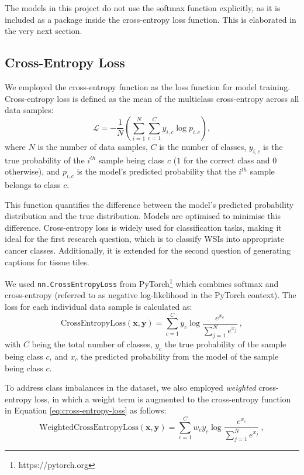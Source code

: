 \documentclass{l4proj}
\begin{document}
The models in this project do not use the softmax function explicitly, as it is included as a package inside the cross-entropy loss function. This is elaborated in the very next section.

\subsection{Cross-Entropy Loss}
We employed the cross-entropy function as the loss function for model training. Cross-entropy loss is defined as the mean of the multiclass cross-entropy across all data samples:
\begin{equation}
    \mathcal{L} = -\frac{1}{N} \left( \sum_{i=1}^N \sum_{c=1}^C y_{i, c} \log p_{i, c} \right),
\end{equation}
where $N$ is the number of data samples, $C$ is the number of classes, $y_{i,c}$ is the true probability of the $i^{th}$ sample being class $c$ ($1$ for the correct class and $0$ otherwise), and $p_{i,c}$ is the model's predicted probability that the $i^{th}$ sample belongs to class $c$.

This function quantifies the difference between the model's predicted probability distribution and the true distribution. Models are optimised to minimise this difference. Cross-entropy loss is widely used for classification tasks, making it ideal for the first research question, which is to classify WSIs into appropriate cancer classes. Additionally, it is extended for the second question of generating captions for tissue tiles.

We used \verb|nn.CrossEntropyLoss| from PyTorch\footnote{https://pytorch.org} which combines softmax and cross-entropy (referred to as negative log-likelihood in the PyTorch context). The loss for each individual data sample is calculated as:
\begin{equation}\label{eq:cross-entropy-loss}
    \text{CrossEntropyLoss}(\boldsymbol{x}, \boldsymbol{y}) = \sum_{c=1}^C y_{c} \log \frac{e^{x_c}}{\sum\limits^{N}_{j=1}e^{x_j}}\ ,
\end{equation}
with $C$ being the total number of classes, $y_c$ the true probability of the sample being class $c$, and $x_c$ the predicted probability from the model of the sample being class $c$.

To address class imbalances in the dataset, we also employed \emph{weighted} cross-entropy loss, in which a weight term is augmented to the cross-entropy function in Equation \ref{eq:cross-entropy-loss} as follows:
\begin{equation}
    \text{WeightedCrossEntropyLoss}(\boldsymbol{x}, \boldsymbol{y}) = \sum_{c=1}^C w_c y_{c} \log \frac{e^{x_c}}{\sum\limits^{N}_{j=1}e^{x_j}}\ ,
\end{equation}
\end{document}
